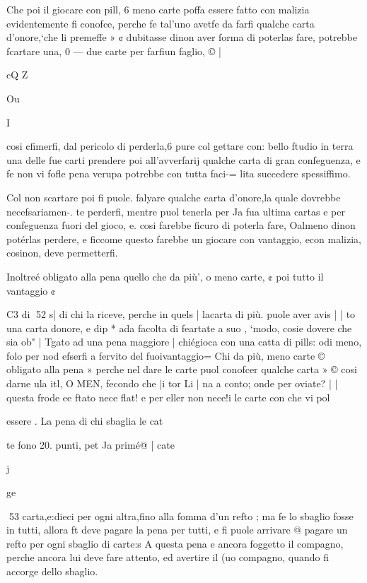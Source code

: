 \documentclass[11pt,a6paper]{article}
\begin{document}
Che poi il giocare con pill, 6
meno carte poffa essere fatto
con malizia evidentemente fi
conofce, perche fe tal’uno avetfe da farfi qualche carta d’onore,‘che li premeffe » ¢ dubitasse
dinon aver forma di poterlas
fare, potrebbe fcartare una, 0 —
due carte per farfiun faglio, © |

cQ
Z
 

Ou

I

cosi ¢fimerfi, dal pericolo di
perderla,6 pure col gettare con:
bello ftudio in terra una delle
fue carti prendere poi all’avverfarij qualche carta di gran confeguenza, e fe non vi fofle pena
verupa potrebbe con tutta faci-=
lita succedere spessiffimo. 

Col non scartare poi fi puole.
falyare qualche carta d’onore,la
quale dovrebbe necefsariamen-.
te perderfi, mentre puol tenerla per Ja fua ultima cartas e per
confeguenza fuori del gioco, e.
cosi farebbe ficuro di poterla fare, Oalmeno dinon potérlas
perdere, e ficcome questo farebbe un giocare con vantaggio, econ malizia, cosinon,
deve permetterfi.

Inoltreé obligato alla pena
quello che da più’, o meno carte, ¢ poi tutto il vantaggio ¢

C3 di
52
s| di chi la riceve, perche in quels
| lacarta di più. puole aver avis
| | to una carta donore, e dip *
ada facolta di feartate a suo
, ‘modo, cosie dovere che sia ob"
| Tgato ad una pena maggiore
| chiégioca con una catta di pills:
odi meno, folo per nod efserfi
a fervito del fuoivantaggio=
Chi da più, meno carte ©
obligato alla pena » perche nel
dare le carte puol conofcer
qualche carta » © cosi darne ula
itl, O MEN, fecondo che |i tor
Li | na a conto; onde per oviate?
| | questa frode ee ftato nece flat!
e per eller
non nece!i le carte con
che vi pol

essere .
La pena di chi sbaglia le cat

te fono 20. punti, pet Ja primé@
| cate

 

 

j

ge

 
53
carta,e:dieci per ogni altra,fino
alla fomma d’un refto ; ma fe lo
sbaglio fosse in tutti, allora ft
deve pagare la pena per tutti,
e fi puole arrivare @ pagare un
refto per ogni sbaglio di carte:s
A questa pena e ancora foggetto
il compagno, perche ancora lui
deve fare attento, ed avertire
il (uo compagno, quando fi accorge dello sbaglio.
\end{document}

